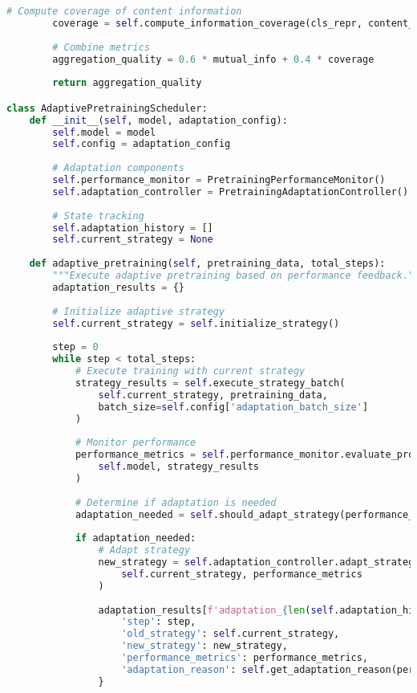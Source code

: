 \begin{lstlisting}[language=Python, caption=Progressive curriculum framework for special token pretraining]
        # Compute coverage of content information
        coverage = self.compute_information_coverage(cls_repr, content_repr)
        
        # Combine metrics
        aggregation_quality = 0.6 * mutual_info + 0.4 * coverage
        
        return aggregation_quality

class AdaptivePretrainingScheduler:
    def __init__(self, model, adaptation_config):
        self.model = model
        self.config = adaptation_config
        
        # Adaptation components
        self.performance_monitor = PretrainingPerformanceMonitor()
        self.adaptation_controller = PretrainingAdaptationController()
        
        # State tracking
        self.adaptation_history = []
        self.current_strategy = None
        
    def adaptive_pretraining(self, pretraining_data, total_steps):
        """Execute adaptive pretraining based on performance feedback."""
        adaptation_results = {}
        
        # Initialize adaptive strategy
        self.current_strategy = self.initialize_strategy()
        
        step = 0
        while step < total_steps:
            # Execute training with current strategy
            strategy_results = self.execute_strategy_batch(
                self.current_strategy, pretraining_data, 
                batch_size=self.config['adaptation_batch_size']
            )
            
            # Monitor performance
            performance_metrics = self.performance_monitor.evaluate_progress(
                self.model, strategy_results
            )
            
            # Determine if adaptation is needed
            adaptation_needed = self.should_adapt_strategy(performance_metrics)
            
            if adaptation_needed:
                # Adapt strategy
                new_strategy = self.adaptation_controller.adapt_strategy(
                    self.current_strategy, performance_metrics
                )
                
                adaptation_results[f'adaptation_{len(self.adaptation_history)}'] = {
                    'step': step,
                    'old_strategy': self.current_strategy,
                    'new_strategy': new_strategy,
                    'performance_metrics': performance_metrics,
                    'adaptation_reason': self.get_adaptation_reason(performance_metrics)
                }
                

\end{lstlisting}
